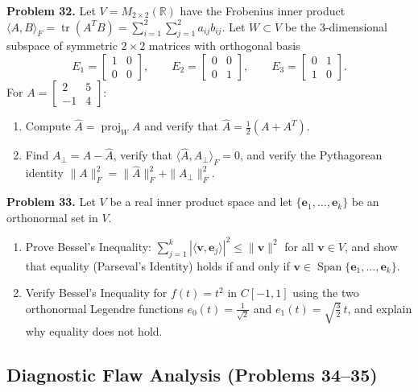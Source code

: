 \documentclass[11pt, letterpaper]{article}
\theoremstyle{definition}
\theoremstyle{remark}
\begin{document}
\textbf{Problem 32.} Let $V = M_{2\times 2}(\mathbb{R})$ have the Frobenius inner product $\langle A, B \rangle_F = \operatorname{tr}(A^T B) = \sum_{i=1}^2 \sum_{j=1}^2 a_{ij}b_{ij}$. Let $W \subset V$ be the $3$-dimensional subspace of symmetric $2 \times 2$ matrices with orthogonal basis
\[
E_1 = \begin{bmatrix} 1 & 0 \\ 0 & 0 \end{bmatrix}, \qquad E_2 = \begin{bmatrix} 0 & 0 \\ 0 & 1 \end{bmatrix}, \qquad E_3 = \begin{bmatrix} 0 & 1 \\ 1 & 0 \end{bmatrix}.
\]
For $A = \begin{bmatrix} 2 & 5 \\ -1 & 4 \end{bmatrix}$:
\begin{enumerate}[label=(\alph*)]
    \item Compute $\hat{A} = \operatorname{proj}_W A$ and verify that $\hat{A} = \frac{1}{2}(A + A^T)$.
    \item Find $A_\perp = A - \hat{A}$, verify that $\langle \hat{A}, A_\perp \rangle_F = 0$, and verify the Pythagorean identity $\|A\|_F^2 = \|\hat{A}\|_F^2 + \|A_\perp\|_F^2$.
\end{enumerate}

\textbf{Problem 33.} Let $V$ be a real inner product space and let $\{\mathbf{e}_1, \dots, \mathbf{e}_k\}$ be an orthonormal set in $V$.
\begin{enumerate}[label=(\alph*)]
    \item Prove Bessel's Inequality: $\sum_{j=1}^k |\langle \mathbf{v}, \mathbf{e}_j \rangle|^2 \le \|\mathbf{v}\|^2$ for all $\mathbf{v} \in V$, and show that equality (Parseval's Identity) holds if and only if $\mathbf{v} \in \operatorname{Span}\{\mathbf{e}_1, \dots, \mathbf{e}_k\}$.
    \item Verify Bessel's Inequality for $f(t) = t^2$ in $C[-1, 1]$ using the two orthonormal Legendre functions $e_0(t) = \frac{1}{\sqrt{2}}$ and $e_1(t) = \sqrt{\frac{3}{2}}\,t$, and explain why equality does not hold.
\end{enumerate}

\subsection{Diagnostic Flaw Analysis (Problems 34--35)}
\end{document}
